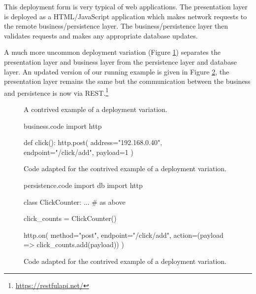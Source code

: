 This deployment form is very typical of web applications.
The presentation layer is deployed as a HTML/JavaScript application which makes network requests to the remote business/persistence layer.
The business/persistence layer then validates requests and makes any appropriate database updates.

A much more uncommon deployment variation (Figure \ref{fig:uncommon-diagram}) separates
the presentation layer and business layer from the persistence layer and database layer.
An updated version of our running example is given in Figure \ref{fig:uncommon-code},
the presentation layer remains the same but the communication between the business and persistence is now via REST.\footnote{\url{https://restfulapi.net/}}

\begin{figure}[ht]
    \centering
    \caption{A contrived example of a deployment variation.}
    \label{fig:uncommon-diagram}
\end{figure}

\begin{figure}[H]
\begin{code}[style=python]{business.code}
import http

def click():
    http.post(
        address="192.168.0.40",
        endpoint="/click/add",
        payload=1
    )
\end{code}
\caption{Code adapted for the contrived example of a deployment variation.}
\label{fig:uncommon-code}
\end{figure}

\begin{figure}[H]
\ContinuedFloat
\begin{code}[style=python]{persistence.code}
import db
import http

class ClickCounter:
    ... # as above

click_counts = ClickCounter()

http.on(
    method="post",
    endpoint="/click/add",
    action=(payload => click_counts.add(payload))
)
\end{code}
\caption{Code adapted for the contrived example of a deployment variation.}
\end{figure}

